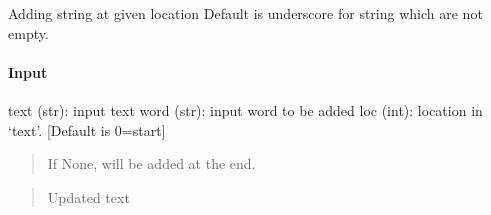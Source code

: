 \documentclass[letterpaper,10pt,english]{sphinxmanual}
\begin{document}
\begin{fulllineitems}
\label{\detokenize{api/pymusepipe:pymusepipe.util_pipe.add_string}}
\pysigstartsignatures
{}
\pysigstopsignatures
\sphinxAtStartPar
Adding string at given location
Default is underscore for string which are not empty.


\paragraph{Input}
\label{\detokenize{api/pymusepipe:id158}}
\sphinxAtStartPar
text (str): input text
word (str): input word to be added
loc (int): location in ‘text’. {[}Default is 0=start{]}
\begin{quote}

\sphinxAtStartPar
If None, will be added at the end.
\end{quote}
\begin{quote}\begin{description}
\sphinxAtStartPar
Updated text

\end{description}\end{quote}

\end{fulllineitems}

\end{document}
